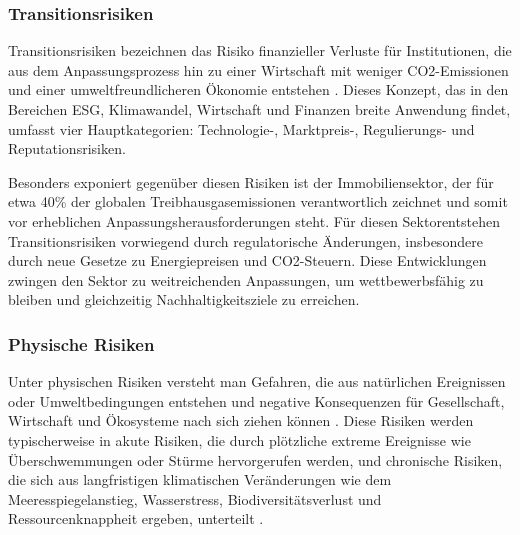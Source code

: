 \subsubsection{Transitionsrisiken}
Transitionsrisiken bezeichnen das Risiko finanzieller Verluste für Institutionen, die aus dem Anpassungsprozess hin zu einer Wirtschaft mit weniger CO2-Emissionen und einer umweltfreundlicheren Ökonomie entstehen \parencite{ecb2020climate}. Dieses Konzept, das in den Bereichen ESG, Klimawandel, Wirtschaft und Finanzen breite Anwendung findet, umfasst vier Hauptkategorien: Technologie-, Marktpreis-, Regulierungs- und Reputationsrisiken.

Besonders exponiert gegenüber diesen Risiken ist der Immobiliensektor, der für etwa 40\% der globalen Treibhausgasemissionen verantwortlich zeichnet \parencite{unepfi2023realestate} und somit vor erheblichen Anpassungsherausforderungen steht.
Für diesen Sektorentstehen Transitionsrisiken vorwiegend durch regulatorische Änderungen, insbesondere durch neue Gesetze zu Energiepreisen und CO2-Steuern. Diese Entwicklungen zwingen den Sektor zu weitreichenden Anpassungen, um wettbewerbsfähig zu bleiben und gleichzeitig Nachhaltigkeitsziele zu erreichen.
\subsubsection{Physische Risiken}
Unter physischen Risiken versteht man Gefahren, die aus natürlichen Ereignissen oder Umweltbedingungen entstehen und negative Konsequenzen für Gesellschaft, Wirtschaft und Ökosysteme nach sich ziehen können \parencite{greenvisionsolutions_transitorische_2024}. Diese Risiken werden typischerweise in akute Risiken, die durch plötzliche extreme Ereignisse wie Überschwemmungen oder Stürme hervorgerufen werden, und chronische Risiken, die sich aus langfristigen klimatischen Veränderungen wie dem Meeresspiegelanstieg, Wasserstress, Biodiversitätsverlust und Ressourcenknappheit ergeben, unterteilt \parencite{dnb2019values}.

